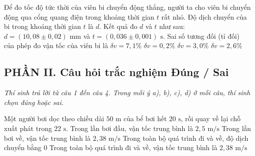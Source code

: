 \begin{ex} Để đo tốc độ tức thời của viên bi chuyển động thẳng, người ta cho viên bi chuyển động qua cổng quang điện trong khoảng thời gian $t$ rất nhỏ. Độ dịch chuyển của bi trong khoảng thời gian $t$ là $d$. Kết quả đo $d$ và $t$ như sau: $d = (10{,}08 \pm 0{,}02)\text{ mm}$ và $t = (0{,}036 \pm 0{,}001)\text{ s}$. Sai số tương đối (tỉ đối) của phép đo vận tốc của viên bi là
\choice
{$\delta v = 7{,}1\%$}
{$\delta v = 0{,}2\%$}
{\True $\delta v = 3{,}0\%$}
{$\delta v = 2{,}6\%$}
\end{ex}

\setcounter{ex}{0}
\subsection*{PHẦN II. Câu hỏi trắc nghiệm Đúng / Sai}
\textit{Thí sinh trả lời từ câu 1 đến câu 4. Trong mỗi ý a), b), c), d) ở mỗi câu, thí sinh chọn đúng hoặc sai.}

\begin{ex} Một người bơi dọc theo chiều dài $50\text{ m}$ của bể bơi hết $20\text{ s}$, rồi quay về lại chỗ xuất phát trong $22\text{ s}$.
\choiceTF
{\True Trong lần bơi đầu, vận tốc trung bình là $2{,}5\text{ m/s}$}
{Trong lần bơi về, vận tốc trung bình là $2{,}38\text{ m/s}$}
{\True Trong toàn bộ quá trình đi và về, độ dịch chuyển bằng 0}
{Trong toàn bộ quá trình đi và về, vận tốc trung bình là $2{,}38\text{ m/s}$}
\end{ex}

